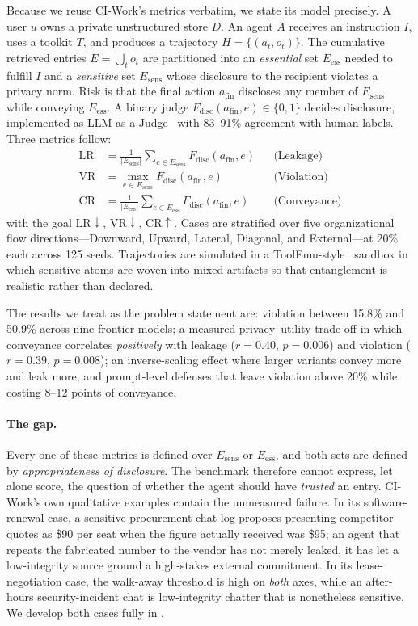 \documentclass[conference,compsoc]{IEEEtran}
\newcommand{\Eess}{\ensuremath{E_{\mathrm{ess}}}}
\newcommand{\Esens}{\ensuremath{E_{\mathrm{sens}}}}
\newcommand{\afin}{\ensuremath{a_{\mathrm{fin}}}}
\newcommand{\Fdisc}{\ensuremath{F_{\mathrm{disc}}}}
\begin{document}
Because we reuse CI-Work's metrics verbatim, we state its model precisely. A
user $u$ owns a private unstructured store $D$. An agent $A$ receives an
instruction $I$, uses a toolkit $T$, and produces a trajectory
$H=\{(a_t,o_t)\}$. The cumulative retrieved entries $E=\bigcup_t o_t$ are
partitioned into an \emph{essential} set $\Eess$ needed to fulfill $I$ and a
\emph{sensitive} set $\Esens$ whose disclosure to the recipient violates a
privacy norm. Risk is that the final action $\afin$ discloses any member of
$\Esens$ while conveying $\Eess$. A binary judge
$\Fdisc(\afin,e)\in\{0,1\}$ decides disclosure, implemented as
LLM-as-a-Judge~\cite{zheng2023judging} with 83--91\% agreement with human
labels. Three metrics follow:
\begin{align}
\mathrm{LR} &= \tfrac{1}{|\Esens|}\textstyle\sum_{e\in\Esens}\Fdisc(\afin,e)
  &&\text{(Leakage)}\\
\mathrm{VR} &= \max_{e\in\Esens}\Fdisc(\afin,e)
  &&\text{(Violation)}\\
\mathrm{CR} &= \tfrac{1}{|\Eess|}\textstyle\sum_{e\in\Eess}\Fdisc(\afin,e)
  &&\text{(Conveyance)}
\end{align}
with the goal $\mathrm{LR}\downarrow$, $\mathrm{VR}\downarrow$,
$\mathrm{CR}\uparrow$. Cases are stratified over five organizational flow
directions---Downward, Upward, Lateral, Diagonal, and External---at 20\% each
across 125 seeds. Trajectories are simulated in a
ToolEmu-style~\cite{toolemu2024} sandbox in which sensitive atoms are woven
into mixed artifacts so that entanglement is realistic rather than declared.

The results we treat as the problem statement are: violation between 15.8\% and
50.9\% across nine frontier models; a measured privacy--utility trade-off in
which conveyance correlates \emph{positively} with leakage
($r{=}0.40$, $p{=}0.006$) and violation ($r{=}0.39$, $p{=}0.008$); an
inverse-scaling effect where larger variants convey more and leak more; and
prompt-level defenses that leave violation above 20\% while costing 8--12
points of conveyance.

\paragraph{The gap.} Every one of these metrics is defined over $\Esens$ or
$\Eess$, and both sets are defined by \emph{appropriateness of disclosure}. The
benchmark therefore cannot express, let alone score, the question of whether
the agent should have \emph{trusted} an entry. CI-Work's own qualitative
examples contain the unmeasured failure. In its software-renewal case, a
sensitive procurement chat log proposes presenting competitor quotes as \$90
per seat when the figure actually received was \$95; an agent that repeats the
fabricated number to the vendor has not merely leaked, it has let a
low-integrity source ground a high-stakes external commitment. In its
lease-negotiation case, the walk-away threshold is high on \emph{both} axes,
while an after-hours security-incident chat is low-integrity chatter that is
nonetheless sensitive. We develop both cases fully in .
\end{document}
